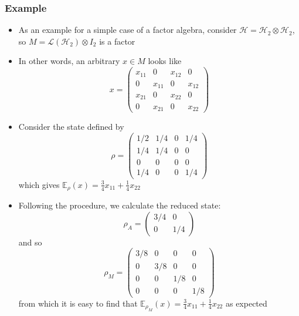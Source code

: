 \documentclass[12pt,a4paper]{article}
\numberwithin{equation}{section}
\theoremstyle{definition}
\theoremstyle{theorem}
\begin{document}
	\subsubsection{Example}
	\begin{itemize}
		\item As an example for a simple case of a factor algebra, consider $\mathcal{H}=\mathcal{H}_{2}\otimes\mathcal{H}_{2}$, so $M=\mathcal{L}(\mathcal{H}_{2})\otimes I_{2}$ is a factor
		\item In other words, an arbitrary $x\in M$ looks like
		\begin{equation}
			x=\begin{pmatrix}x_{11}&0&x_{12}&0\\0&x_{11}&0&x_{12}\\x_{21}&0&x_{22}&0\\0&x_{21}&0&x_{22}\end{pmatrix}
		\end{equation}
		\item Consider the state defined by
		\begin{equation}
			\rho=\begin{pmatrix}
				1/2&1/4&0&1/4\\1/4&1/4&0&0\\0&0&0&0\\1/4&0&0&1/4
			\end{pmatrix}
		\end{equation}
		which gives $\mathbb{E}_{\rho}(x)=\frac{3}{4}x_{11}+\frac{1}{4}x_{22}$
		\item Following the procedure, we calculate the reduced state:
		\begin{equation}
			\rho_{A}=\begin{pmatrix}
				3/4&0\\0&1/4
			\end{pmatrix}
		\end{equation}
		and so 
		\begin{equation}
			\rho_{M}=\begin{pmatrix}
				3/8&0&0&0\\0&3/8&0&0\\0&0&1/8&0\\0&0&0&1/8
			\end{pmatrix}
		\end{equation}
		from which it is easy to find that $\mathbb{E}_{\rho_{M}}(x)=\frac{3}{4}x_{11}+\frac{1}{4}x_{22}$ as expected
	\end{itemize}
\end{document}
